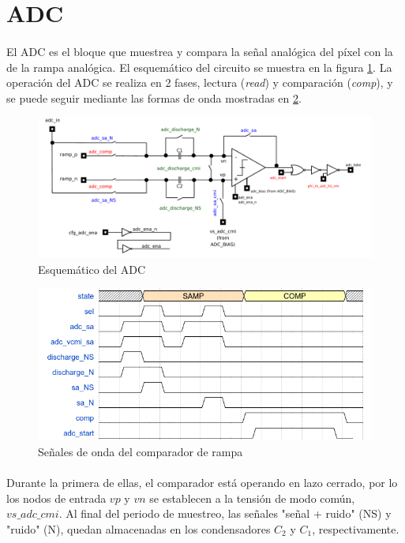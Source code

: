 \section{ADC}\label{cap:ro_sch_adc}

\paragraph{}
El ADC es el bloque que muestrea y compara la señal analógica del píxel con la de la
rampa analógica. El esquemático del circuito se muestra en la figura \ref{fig:adc_sch}.
La operación del ADC se realiza en 2 fases, lectura (\textit{read}) y comparación
(\textit{comp}), y se puede seguir mediante las formas de onda mostradas en \ref{fig:adc_wave}.

\begin{figure}[h]
	\includegraphics[width=\textwidth]{svg/adc_sch.pdf}
	\caption{Esquemático del ADC}
	\label{fig:adc_sch}
\end{figure}

\begin{figure}[h]
	\includegraphics[width=\textwidth]{img/adc_wave.png}
	\caption{Señales de onda del comparador de rampa}
	\label{fig:adc_wave}
\end{figure}

\paragraph{}
Durante la primera de ellas, el comparador está operando en lazo cerrado, por lo
los nodos de entrada $vp$ y $vn$ se establecen a la tensión de modo
común, $vs\_adc\_cmi$. Al final del periodo de muestreo, las señales
"señal + ruido" (NS) y "ruido" (N), quedan almacenadas en los condensadores $C_2$
y $C_1$, respectivamente.

